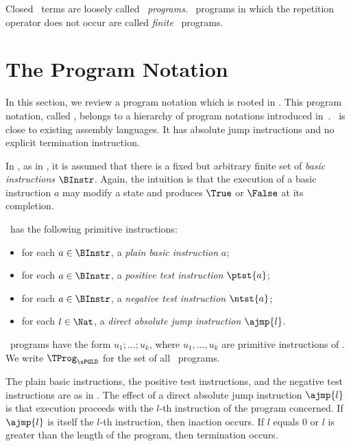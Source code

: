 \documentclass[fleqn]{llncs}
\begin{document}
Closed \PGA\ terms are loosely called \PGA\ \emph{programs}.
\PGA\ programs in which the repetition operator does not occur are
called \emph{finite} \PGA\ programs.

\section{The Program Notation \PGLD}
\label{sect-PGLD}

In this section, we review a program notation which is rooted in \PGA.
This program notation, called \PGLD, belongs to a hierarchy of program
notations introduced in~\cite{BL02a}.
\PGLD\ is close to existing assembly languages.
It has absolute jump instructions and no explicit termination
instruction.

In \PGLD, as in \PGA, it is assumed that there is a fixed but arbitrary
finite set of \emph{basic instructions} $\BInstr$.
Again, the intuition is that the execution of a basic instruction $a$
may modify a state and produces $\True$ or $\False$ at its completion.

\PGLD\ has the following primitive instructions:
\begin{itemize}
\item
for each $a \in \BInstr$, a \emph{plain basic instruction} $a$;
\item
for each $a \in \BInstr$, a \emph{positive test instruction} $\ptst{a}$;
\item
for each $a \in \BInstr$, a \emph{negative test instruction} $\ntst{a}$;
\item
for each $l \in \Nat$, a \emph{direct absolute jump instruction}
$\ajmp{l}$.
\end{itemize}
\PGLD\ programs have the form $u_1;\ldots;u_k$, where $u_1,\ldots,u_k$
are primitive instructions of \PGLD.
We write $\TProg_\sPGLD$ for the set of all \PGLD\ programs.

The plain basic instructions, the positive test instructions, and the
negative test instructions are as in \PGA.
The effect of a direct absolute jump instruction $\ajmp{l}$ is that
execution proceeds with the $l$-th instruction of the program concerned.
If $\ajmp{l}$ is itself the $l$-th instruction, then inaction occurs.
If $l$ equals $0$ or $l$ is greater than the length of the program, then
termination occurs.
\end{document}
